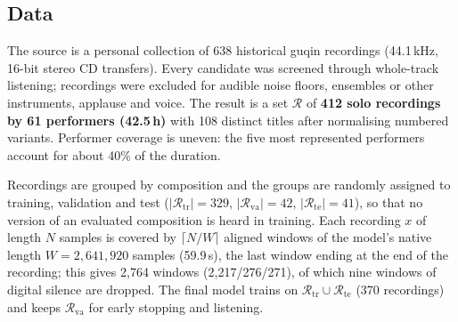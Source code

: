 \subsection{Data}\label{sec:data}
The source is a personal collection of 638 historical guqin recordings (44.1\,kHz, 16-bit stereo CD transfers). Every
candidate was screened through whole-track listening; recordings were excluded for audible noise
floors, ensembles or other instruments, applause and voice. The result is a set $\mathcal{R}$ of
\textbf{412 solo recordings by 61 performers (42.5\,h)} with 108 distinct titles after normalising numbered
variants. Performer coverage is uneven: the five most represented performers account for about 40\% of the duration.

Recordings are grouped by composition and the groups are randomly assigned to training, validation and test
($|\mathcal{R}_{\mathrm{tr}}|=329$, $|\mathcal{R}_{\mathrm{va}}|=42$, $|\mathcal{R}_{\mathrm{te}}|=41$), so that no
version of an evaluated composition is heard in training. Each recording $x$ of length $N$ samples is covered by
$\lceil N/W \rceil$ aligned windows of the model's native length $W = 2{,}641{,}920$ samples (59.9\,s), the last
window ending at the end of the recording; this gives 2{,}764 windows (2{,}217/276/271), of which nine windows of
digital silence are dropped. The final model trains on $\mathcal{R}_{\mathrm{tr}}\cup\mathcal{R}_{\mathrm{te}}$
(370 recordings) and keeps $\mathcal{R}_{\mathrm{va}}$ for early stopping and listening.

